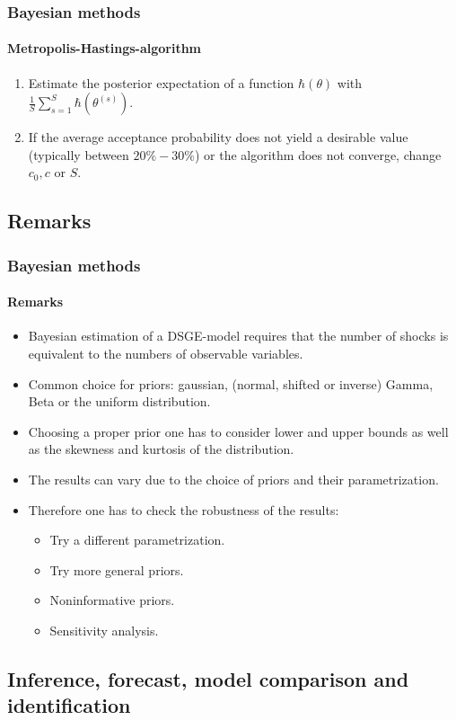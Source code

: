 \documentclass[handout]{beamer}  %
\newcounter{saveenumi}
\newcommand{\conti}{\setcounter{enumi}{\value{saveenumi}}}
\begin{document}
\begin{frame}\frametitle{Bayesian methods}\framesubtitle{Metropolis-Hastings-algorithm}
\begin{enumerate}\conti
  \item Estimate the posterior expectation of a function
      $\hbar({\theta})$ with $\frac{1}{S}\sum_{s=1}^S
      \hbar\left({\theta^{(s)}}\right)$.
  \item If the average acceptance probability does not yield a desirable value (typically between $20\%-30\%$) or the algorithm does not converge, change $c_0,c$ or $S$.
\end{enumerate}

\end{frame}

\subsection{Remarks}
\begin{frame}\frametitle{Bayesian methods}\framesubtitle{Remarks}
  \begin{itemize}
    \item Bayesian estimation of a DSGE-model requires that the number of shocks is equivalent to the numbers of observable variables.
    \item Common choice for priors: gaussian, (normal, shifted or inverse) Gamma, Beta or the uniform distribution.
    \item Choosing a proper prior one has to consider lower and upper bounds as well as the skewness and kurtosis of the distribution.
    \item The results can vary due to the choice of priors and their parametrization.
    \item Therefore one has to check the robustness of the results:
    \begin{itemize}
      \item Try a different parametrization.
      \item Try more general priors.
      \item Noninformative priors.
      \item Sensitivity analysis.
    \end{itemize}
  \end{itemize}
\end{frame}


\subsection{Inference, forecast, model comparison and identification}
\end{document}
